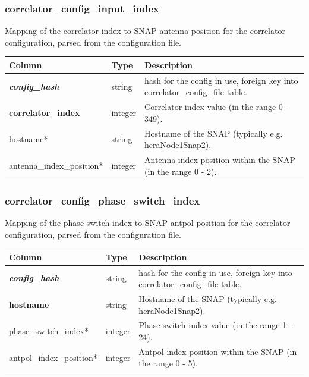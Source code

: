 \documentclass{article}
\begin{document}
{\subsubsection{correlator\_config\_input\_index}
Mapping of the correlator index to SNAP antenna position for the correlator configuration, parsed from the configuration file.
\begin{center}
 \begin{tabular}{| p{4cm} | p{2cm} | p{10cm} |}
\hline
 {\bf Column} & {\bf Type}  & {\bf Description} \\ [0.5ex]  \hline\hline
\textbf{\textit{config\_hash}} & string & hash for the config in use, foreign key into correlator\_config\_file table.\\ \hline
\textbf{correlator\_index} & integer & Correlator index value (in the range 0 - 349). \\ \hline
hostname* & string & Hostname of the SNAP (typically e.g. heraNode1Snap2). \\ \hline
antenna\_index\_position* & integer & Antenna index position within the SNAP (in the range 0 - 2). \\ \hline
\end{tabular}
\end{center}

\subsubsection{correlator\_config\_phase\_switch\_index}
Mapping of the phase switch index to SNAP antpol position for the correlator configuration, parsed from the configuration file.
\begin{center}
 \begin{tabular}{| p{4cm} | p{2cm} | p{10cm} |}
\hline
 {\bf Column} & {\bf Type}  & {\bf Description} \\ [0.5ex]  \hline\hline
\textbf{\textit{config\_hash}} & string & hash for the config in use, foreign key into correlator\_config\_file table.\\ \hline
\textbf{hostname} & string & Hostname of the SNAP (typically e.g. heraNode1Snap2). \\ \hline
phase\_switch\_index* & integer & Phase switch index value (in the range 1 - 24). \\ \hline
antpol\_index\_position* & integer & Antpol index position within the SNAP (in the range 0 - 5). \\ \hline
\end{tabular}
\end{center}

}
\end{document}
